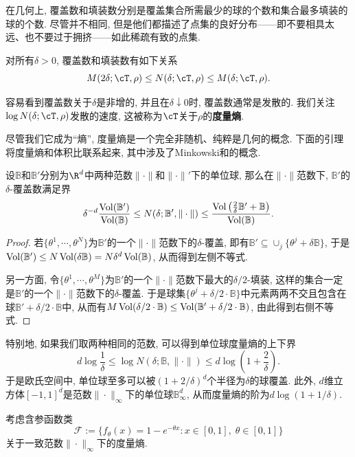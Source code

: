 在几何上, 覆盖数和填装数分别是覆盖集合所需最少的球的个数和集合最多填装的球的个数. 
尽管并不相同, 但是他们都描述了点集的良好分布——即不要相具太远、也不要过于拥挤——如此稀疏有致的点集. 

\begin{lemma}[覆盖数和填装数]\label{lemma:CoveringAndPacking}
	对所有$\delta > 0$, 覆盖数和填装数有如下关系
	\begin{equation*}
		M(2 \delta; \cT, \rho)
		\leq N(\delta; \cT, \rho)
		\leq M(\delta; \cT, \rho). 
	\end{equation*}
\end{lemma}


容易看到覆盖数关于$\delta$是非增的, 并且在$\delta \downarrow 0$时, 覆盖数通常是发散的. 
我们关注$\log N(\delta; \cT, \rho)$发散的速度, 这被称为$\cT$关于$\rho$的\textbf{度量熵}. 

尽管我们它成为“熵”, 度量熵是一个完全非随机、纯粹是几何的概念. 
下面的引理将度量熵和体积比联系起来, 其中涉及了Minkowski和的概念. 
\begin{lemma}
	设$\mathbb{B}$和$\mathbb{B}'$分别为$\R^d$中两种范数$\|\cdot\|$和$\|\cdot\|'$下的单位球, 那么在$\|\cdot\|$范数下, $\mathbb{B}'$的$\delta$-覆盖数满足界
	\begin{equation*}
		\delta^{-d} \frac{\operatorname{Vol}(\mathbb{B}')}{\operatorname{Vol}(\mathbb{B})}
		\leq N(\delta; \mathbb{B}', \|\cdot\|) 
		\leq \frac{\operatorname{Vol}\left(\frac{2}{\delta} \mathbb{B}' + \mathbb{B} \right)}{\operatorname{Vol}(\mathbb{B})}. 
	\end{equation*}
\end{lemma}
\begin{proof}
	若$\{\theta^1, \cdots, \theta^N\}$为$\mathbb{B}'$的一个$\|\cdot\|$范数下的$\delta$-覆盖, 即有$\mathbb{B}' \subseteq \cup_j \{\theta^j + \delta \mathbb{B}\}$, 于是$\operatorname{Vol}(\mathbb{B}') \leq N \operatorname{Vol}(\delta \mathbb{B}) = N \delta^d \operatorname{Vol}(\mathbb{B})$, 从而得到左侧不等式. 
	
	另一方面, 令$\{\theta^1, \cdots, \theta^M\}$为$\mathbb{B}'$的一个$\|\cdot\|$范数下最大的$\delta/2$-填装, 这样的集合一定是$\mathbb{B}'$的一个$\|\cdot\|$范数下的$\delta$-覆盖. 
	于是球集$\{\theta^j + \delta/2 \cdot \mathbb{B} \}$中元素两两不交且包含在球$\mathbb{B}' + \delta/2 \cdot \mathbb{B}$中, 从而有$M \operatorname{Vol}(\delta/2 \cdot \mathbb{B}) \leq \operatorname{Vol}(\mathbb{B}' + \delta/2 \cdot \mathbb{B})$, 由此得到右侧不等式. 
\end{proof}

特别地, 如果我们取两种相同的范数, 可以得到单位球度量熵的上下界
\begin{equation*}
	d \log \frac{1}{\delta}  
	\leq \log N(\delta; \mathbb{B}, \|\cdot\|) 
	\leq d \log \left(1 + \frac{2}{\delta}\right). 
\end{equation*}
于是欧氏空间中, 单位球至多可以被$(1+2/\delta)^d$个半径为$\delta$的球覆盖. 
此外, $d$维立方体$[-1,1]^d$是范数$\|\cdot\|_{\infty}$下的单位球$\mathbb{B}^d_{\infty}$, 从而度量熵的阶为$d \log(1+1/\delta)$. 


\begin{example}[一个函数类的度量熵]
	考虑含参函数类
	\begin{equation*}
		\mathscr{F} := \{f_{\theta}(x) = 1 - e^{-\theta x} \colon x \in [0,1],\; \theta \in [0,1] \}
	\end{equation*}
	关于一致范数$\|\cdot\|_{\infty}$下的度量熵. 
	
	
\end{example}












